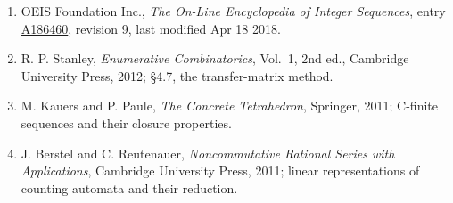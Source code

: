 \documentclass[11pt]{article}
\theoremstyle{definition}
\begin{document}
\begin{enumerate}

\item OEIS Foundation Inc., \emph{The On-Line Encyclopedia of Integer Sequences}, entry \href{https://oeis.org/A186460}{A186460}, revision 9, last modified Apr 18 2018.

\item R. P. Stanley, \emph{Enumerative Combinatorics}, Vol.~1, 2nd ed., Cambridge University Press, 2012; \S4.7, the transfer-matrix method.

\item M. Kauers and P. Paule, \emph{The Concrete Tetrahedron}, Springer, 2011; C-finite sequences and their closure properties.

\item J. Berstel and C. Reutenauer, \emph{Noncommutative Rational Series with Applications}, Cambridge University Press, 2011; linear representations of counting automata and their reduction.

\end{enumerate}
\end{document}
